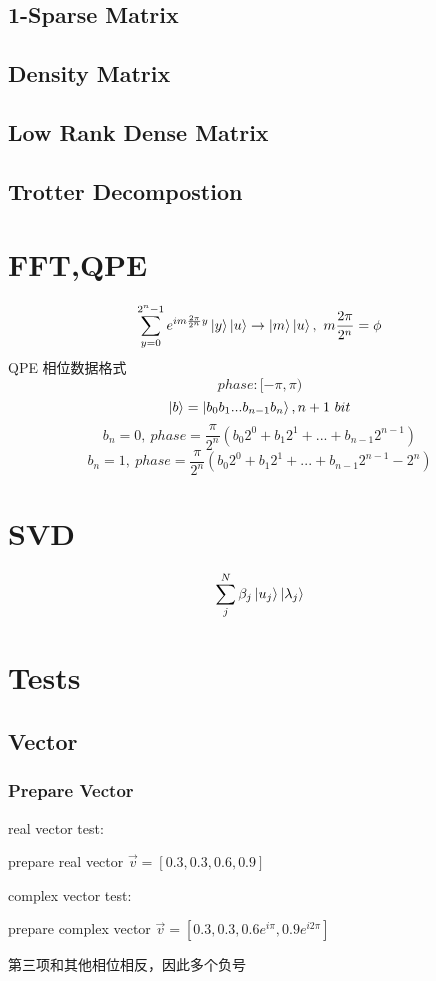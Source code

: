 \documentclass{article}
\begin{document}
\subsection{1-Sparse Matrix}
\subsection{Density Matrix}
\subsection{Low Rank Dense Matrix}
\subsection{Trotter Decompostion}

\section{FFT,QPE}
$$ \sum_{y=0}^{2^n-1} { e^{i m \frac{2\pi}{2^n} y } \ket{y} \ket{u}} \rightarrow \ket{m}\ket{u} ,\ m\frac{2\pi}{2^n} = \phi$$
QPE 相位数据格式
	$$phase:[-\pi,\pi)$$
	$$ \ket{b} = \ket{b_0b_1...b_{n-1}b_n}, n+1\ bit$$
	$$b_n =0,	\  phase= \frac{\pi}{2^{n}} (b_0 2^0 + b_1 2^1+ ... + b_{n-1} 2^{n-1})  $$
    $$b_n =1,	\  phase= \frac{\pi}{2^{n}} (b_0 2^0 + b_1 2^1+ ... + b_{n-1} 2^{n-1}-2^{n})  $$

\section{SVD}
$$ \sum_{j}^{N} { \beta_j \ket{u_j} \ket{\lambda_j} } $$
\section{Tests}
\subsection{Vector}
\subsubsection{Prepare Vector}
real vector test:

	prepare real vector  $ \vec{v} = [ 0.3, 0.3, 0.6, 0.9] $
	
complex vector test:

	prepare complex vector  $ \vec{v} = [ 0.3, 0.3, 0.6e^{i\pi}, 0.9e^{i2\pi}] $
	
	第三项和其他相位相反，因此多个负号
\end{document}
